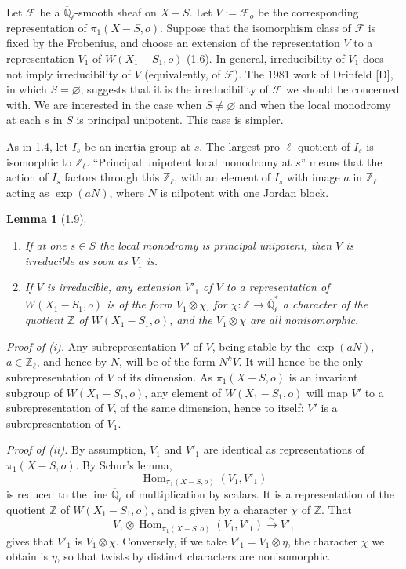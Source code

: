 \documentclass[10pt]{article}
\newcommand{\Ql}{\overline{\mathbb Q}_{\ell}}
\newcommand{\Zl}{\mathbb Z_{\ell}}
\newcommand{\Hom}{\operatorname{Hom}}
\theoremstyle{deligne}
\newtheorem*{lemma*}{Lemma}
\newcommand{\heading}[1]{\vspace{0.7em}\noindent{\bfseries #1}\quad}
\begin{document}
\heading{1.8.} Let $\mathcal F$ be a $\Ql$-smooth sheaf on $X-S$. Let $V:=\mathcal F_o$ be the corresponding representation of $\pi_1(X-S,o)$. Suppose that the isomorphism class of $\mathcal F$ is fixed by the Frobenius, and choose an extension of the representation $V$ to a representation $V_1$ of $W(X_1-S_1,o)$ (1.6). In general, irreducibility of $V_1$ does not imply irreducibility of $V$ (equivalently, of $\mathcal F$). The 1981 work of Drinfeld [D], in which $S=\varnothing$, suggests that it is the irreducibility of $\mathcal F$ we should be concerned with. We are interested in the case when $S\ne\varnothing$ and when the local monodromy at each $s$ in $S$ is principal unipotent. This case is simpler.

As in 1.4, let $I_s$ be an inertia group at $s$. The largest pro-$\ell$ quotient of $I_s$ is isomorphic to $\Zl$. ``Principal unipotent local monodromy at $s$'' means that the action of $I_s$ factors through this $\Zl$, with an element of $I_s$ with image $a$ in $\Zl$ acting as $\exp(aN)$, where $N$ is nilpotent with one Jordan block.

\begin{lemma*}[1.9]
\begin{enumerate}[label=(\roman*)]
\item If at one $s\in S$ the local monodromy is principal unipotent, then $V$ is irreducible as soon as $V_1$ is.
\item If $V$ is irreducible, any extension $V'_1$ of $V$ to a representation of $W(X_1-S_1,o)$ is of the form $V_1\otimes\chi$, for $\chi:\mathbb Z\to\Ql^*$ a character of the quotient $\mathbb Z$ of $W(X_1-S_1,o)$, and the $V_1\otimes\chi$ are all nonisomorphic.
\end{enumerate}
\end{lemma*}

\textit{Proof of (i).} Any subrepresentation $V'$ of $V$, being stable by the $\exp(aN)$, $a\in\Zl$, and hence by $N$, will be of the form $N^kV$. It will hence be the only subrepresentation of $V$ of its dimension. As $\pi_1(X-S,o)$ is an invariant subgroup of $W(X_1-S_1,o)$, any element of $W(X_1-S_1,o)$ will map $V'$ to a subrepresentation of $V$, of the same dimension, hence to itself: $V'$ is a subrepresentation of $V_1$.

\textit{Proof of (ii).} By assumption, $V_1$ and $V'_1$ are identical as representations of $\pi_1(X-S,o)$. By Schur's lemma,
\[
 \Hom_{\pi_1(X-S,o)}(V_1,V'_1)
\]
is reduced to the line $\Ql$ of multiplication by scalars. It is a representation of the quotient $\mathbb Z$ of $W(X_1-S_1,o)$, and is given by a character $\chi$ of $\mathbb Z$. That
\[
 V_1\otimes\Hom_{\pi_1(X-S,o)}(V_1,V'_1)
 \overset{\sim}{\longrightarrow}V'_1
\]
gives that $V'_1$ is $V_1\otimes\chi$. Conversely, if we take $V'_1=V_1\otimes\eta$, the character $\chi$ we obtain is $\eta$, so that twists by distinct characters are nonisomorphic.
\end{document}
